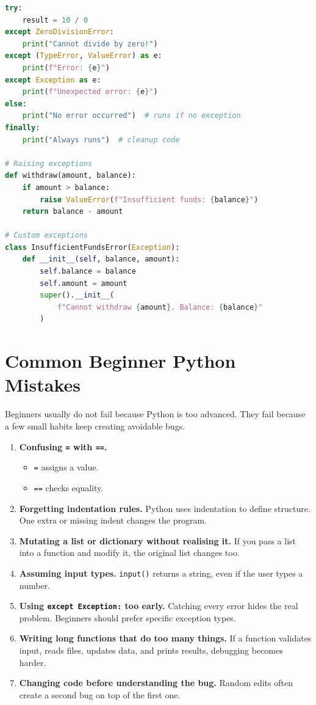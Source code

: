 \documentclass[12pt, a4paper, oneside]{book}
\begin{document}
\begin{lstlisting}[language=Python, caption={Exception handling}]
try:
    result = 10 / 0
except ZeroDivisionError:
    print("Cannot divide by zero!")
except (TypeError, ValueError) as e:
    print(f"Error: {e}")
except Exception as e:
    print(f"Unexpected error: {e}")
else:
    print("No error occurred")  # runs if no exception
finally:
    print("Always runs")  # cleanup code

# Raising exceptions
def withdraw(amount, balance):
    if amount > balance:
        raise ValueError(f"Insufficient funds: {balance}")
    return balance - amount

# Custom exceptions
class InsufficientFundsError(Exception):
    def __init__(self, balance, amount):
        self.balance = balance
        self.amount = amount
        super().__init__(
            f"Cannot withdraw {amount}. Balance: {balance}"
        )
\end{lstlisting}

\section{Common Beginner Python Mistakes}

Beginners usually do not fail because Python is too advanced. They fail because a few small habits keep creating avoidable bugs.

\begin{enumerate}[leftmargin=2em]
    \item \textbf{Confusing \texttt{=} with \texttt{==}.}
    \begin{itemize}
        \item \texttt{=} assigns a value.
        \item \texttt{==} checks equality.
    \end{itemize}

    \item \textbf{Forgetting indentation rules.}
    Python uses indentation to define structure. One extra or missing indent changes the program.

    \item \textbf{Mutating a list or dictionary without realising it.}
    If you pass a list into a function and modify it, the original list changes too.

    \item \textbf{Assuming input types.}
    \texttt{input()} returns a string, even if the user types a number.

    \item \textbf{Using \texttt{except Exception:} too early.}
    Catching every error hides the real problem. Beginners should prefer specific exception types.

    \item \textbf{Writing long functions that do too many things.}
    If a function validates input, reads files, updates data, and prints results, debugging becomes harder.

    \item \textbf{Changing code before understanding the bug.}
    Random edits often create a second bug on top of the first one.
\end{enumerate}
\end{document}

